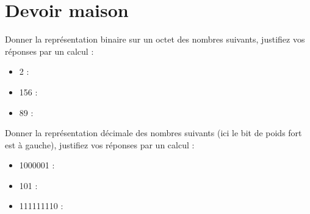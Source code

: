 \section*{Devoir maison }

\begin{Exercise}[title={Un peu de binaire}]
\Question Donner la représentation binaire sur un octet des nombres suivants, justifiez vos réponses par un calcul :
\begin{itemize}
    \item 2 :
    \item 156 :
    \item 89 :
\end{itemize}
\Question Donner la représentation décimale des nombres suivants (ici le bit de poids fort est à gauche), justifiez vos réponses par un calcul :
\begin{itemize}
    \item 1000001 :
    \item 101 :
    \item 111111110 :
\end{itemize}
\end{Exercise}

